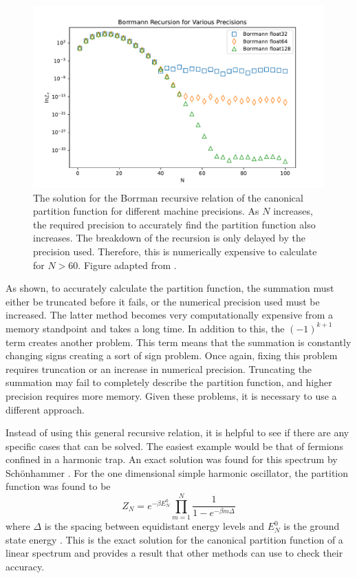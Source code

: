 \begin{figure}[H]
    \centering
    \includegraphics[scale=0.6]{figures/pdf/Borrmann accuracy.pdf}
    \caption{The solution for the Borrman recursive relation of the canonical partition function for different machine precisions. As $N$ increases, the required precision to accurately find the partition function also increases. The breakdown of the recursion is only delayed by the precision used. Therefore, this is numerically expensive to calculate for $N>60$. Figure adapted from \cite{Jiang}.}
    \label{fig:BorrmannAcc}
\end{figure}
As shown, to accurately calculate the partition function, the summation must either be truncated before it fails, or the numerical precision used must be increased. The latter method becomes very computationally expensive from a memory standpoint and takes a long time. 
In addition to this, the $(-1)^{k+1}$ term creates another problem. This term means that the summation is constantly changing signs creating a sort of sign problem. Once again, fixing this problem requires truncation or an increase in numerical precision. Truncating the summation may fail to completely describe the partition function, and higher precision requires more memory. Given these problems, it is necessary to use a different approach. 

Instead of using this general recursive relation, it is helpful to see if there are any specific cases that can be solved. The easiest example would be that of fermions confined in a harmonic trap. An exact solution was found for this spectrum by Sch\"onhammer \cite{Schon1996}. For the one dimensional simple harmonic oscillator, the partition function was found to be
\begin{equation}
    Z_N=e^{-\beta E_N^0} \prod_{m=1}^N \frac{1}{1-e^{-\beta m\Delta}} \label{schoneqn}
\end{equation}
where $\Delta$ is the spacing between equidistant energy levels and $E_N^0$ is the ground state energy \cite{Schon1996}. This is the exact solution for the canonical partition function of a linear spectrum and provides a result that other methods can use to check their accuracy.

